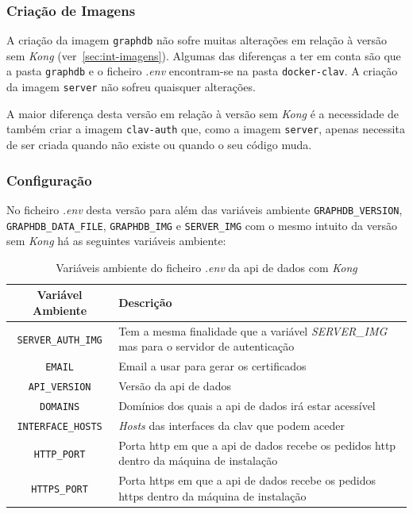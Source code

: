 \subsubsection{Criação de Imagens}

A criação da imagem \texttt{graphdb} não sofre muitas alterações em relação à versão sem \textit{Kong} (ver~\ref{sec:int-imagens}). Algumas das diferenças a ter em conta são que a pasta \texttt{graphdb} e o ficheiro \textit{.env} encontram-se na pasta \texttt{docker-clav}. A criação da imagem \texttt{server} não sofreu quaisquer alterações.

A maior diferença desta versão em relação à versão sem \textit{Kong} é a necessidade de também criar a imagem \texttt{clav-auth} que, como a imagem \texttt{server}, apenas necessita de ser criada quando não existe ou quando o seu código muda.

\subsubsection{Configuração}

No ficheiro \textit{.env} desta versão para além das variáveis ambiente \texttt{GRAPHDB\_VERSION}, \texttt{GRAPHDB\_DATA\_FILE}, \texttt{GRAPHDB\_IMG} e \texttt{SERVER\_IMG} com o mesmo intuito da versão sem \textit{Kong} há as seguintes variáveis ambiente:

\begin{table}[H]
\fontsize{10}{12}\selectfont
\begin{tabularx}{\textwidth}{|c|X|}
    \hline
    Variável Ambiente & Descrição \\ \hline
    \texttt{SERVER\_AUTH\_IMG} & Tem a mesma finalidade que a variável \textit{SERVER\_IMG} mas para o servidor de autenticação \\ \hline
    \texttt{EMAIL} & Email a usar para gerar os certificados \\ \hline
    \texttt{API\_VERSION} & Versão da \acrshort{api} de dados \\ \hline
    \texttt{DOMAINS} & Domínios dos quais a \acrshort{api} de dados irá estar acessível \\ \hline
    \texttt{INTERFACE\_HOSTS} & \textit{Hosts} das interfaces da \acrshort{clav} que podem aceder \\ \hline
    \texttt{HTTP\_PORT} & Porta \acrshort{http} em que a \acrshort{api} de dados recebe os pedidos \acrshort{http} dentro da máquina de instalação \\ \hline
    \texttt{HTTPS\_PORT} & Porta \acrshort{https} em que a \acrshort{api} de dados recebe os pedidos \acrshort{https} dentro da máquina de instalação \\ \hline
\end{tabularx}
\caption{Variáveis ambiente do ficheiro \textit{.env} da \acrshort{api} de dados com \textit{Kong}}
\end{table}

